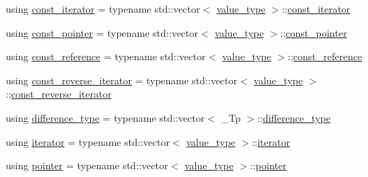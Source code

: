 \begin{DoxyCompactItemize}
\item 
using \hyperlink{class____gnu__cxx_1_1__Polynomial_a96e4523cc2a834724fe4224f0800486b}{const\+\_\+iterator} = typename std\+::vector$<$ \hyperlink{class____gnu__cxx_1_1__Polynomial_a725563351f50e76084a7a016c06f8a53}{value\+\_\+type} $>$\+::\hyperlink{class____gnu__cxx_1_1__Polynomial_a96e4523cc2a834724fe4224f0800486b}{const\+\_\+iterator}
\item 
using \hyperlink{class____gnu__cxx_1_1__Polynomial_aaf4c4bbd516b837df5fe70b3bda4e9af}{const\+\_\+pointer} = typename std\+::vector$<$ \hyperlink{class____gnu__cxx_1_1__Polynomial_a725563351f50e76084a7a016c06f8a53}{value\+\_\+type} $>$\+::\hyperlink{class____gnu__cxx_1_1__Polynomial_aaf4c4bbd516b837df5fe70b3bda4e9af}{const\+\_\+pointer}
\item 
using \hyperlink{class____gnu__cxx_1_1__Polynomial_a55e17774f3387e74adb57376d099cf16}{const\+\_\+reference} = typename std\+::vector$<$ \hyperlink{class____gnu__cxx_1_1__Polynomial_a725563351f50e76084a7a016c06f8a53}{value\+\_\+type} $>$\+::\hyperlink{class____gnu__cxx_1_1__Polynomial_a55e17774f3387e74adb57376d099cf16}{const\+\_\+reference}
\item 
using \hyperlink{class____gnu__cxx_1_1__Polynomial_a2a042a80127ab9a7b0349a54791e59af}{const\+\_\+reverse\+\_\+iterator} = typename std\+::vector$<$ \hyperlink{class____gnu__cxx_1_1__Polynomial_a725563351f50e76084a7a016c06f8a53}{value\+\_\+type} $>$\+::\hyperlink{class____gnu__cxx_1_1__Polynomial_a2a042a80127ab9a7b0349a54791e59af}{const\+\_\+reverse\+\_\+iterator}
\item 
using \hyperlink{class____gnu__cxx_1_1__Polynomial_aefb6d7ae1935b99a332d5b96b1e82d32}{difference\+\_\+type} = typename std\+::vector$<$ \+\_\+\+Tp $>$\+::\hyperlink{class____gnu__cxx_1_1__Polynomial_aefb6d7ae1935b99a332d5b96b1e82d32}{difference\+\_\+type}
\item 
using \hyperlink{class____gnu__cxx_1_1__Polynomial_a64bd557b6af46992e352dbe9e30fa201}{iterator} = typename std\+::vector$<$ \hyperlink{class____gnu__cxx_1_1__Polynomial_a725563351f50e76084a7a016c06f8a53}{value\+\_\+type} $>$\+::\hyperlink{class____gnu__cxx_1_1__Polynomial_a64bd557b6af46992e352dbe9e30fa201}{iterator}
\item 
using \hyperlink{class____gnu__cxx_1_1__Polynomial_a876dcb9c1b92c4896a3f3b9f26e7e3df}{pointer} = typename std\+::vector$<$ \hyperlink{class____gnu__cxx_1_1__Polynomial_a725563351f50e76084a7a016c06f8a53}{value\+\_\+type} $>$\+::\hyperlink{class____gnu__cxx_1_1__Polynomial_a876dcb9c1b92c4896a3f3b9f26e7e3df}{pointer}

\end{DoxyCompactItemize}
